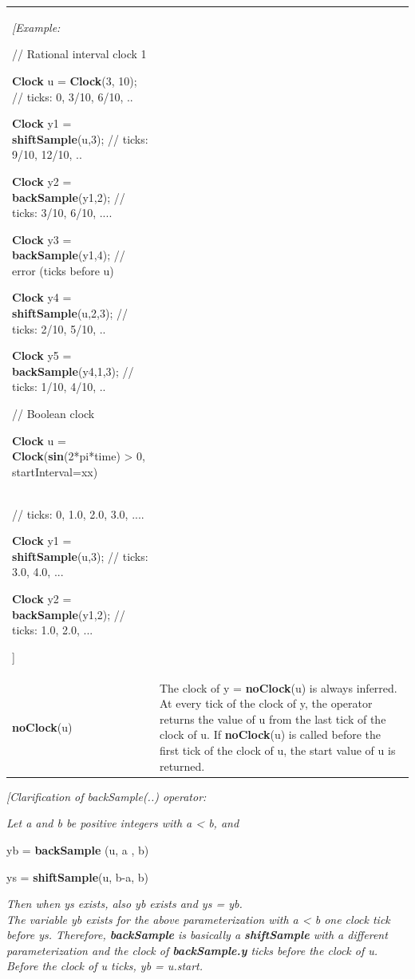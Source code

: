 \documentclass[10pt,a4paper]{report}
\begin{document}
\begin{longtable}[]{@{}ll@{}}
\emph{{[}Example:}

// Rational interval clock 1

\textbf{Clock} u = \textbf{Clock}(3, 10); // ticks: 0, 3/10, 6/10, ..

\textbf{Clock} y1 = \textbf{shiftSample}(u,3); // ticks: 9/10, 12/10, ..

\textbf{Clock} y2 = \textbf{backSample}(y1,2); // ticks: 3/10, 6/10,
....

\textbf{Clock} y3 = \textbf{backSample}(y1,4); // error (ticks before u)

\textbf{Clock} y4 = \textbf{shiftSample}(u,2,3); // ticks: 2/10, 5/10,
..

\textbf{Clock} y5 = \textbf{backSample}(y4,1,3); // ticks: 1/10, 4/10,
..

// Boolean clock

\textbf{Clock} u = \textbf{Clock}(\textbf{sin}(2*pi*time) \textgreater{}
0, startInterval=xx)\\
// ticks: 0, 1.0, 2.0, 3.0, ....

\textbf{Clock} y1 = \textbf{shiftSample}(u,3); // ticks: 3.0, 4.0, ...

\textbf{Clock} y2 = \textbf{backSample}(y1,2); // ticks: 1.0, 2.0, ...

{]}
\\ \hline
\textbf{noClock}(u)\strut
&
The clock of y = \textbf{noClock}(u) is always inferred. At every tick
of the clock of y, the operator returns the value of u from the last
tick of the clock of u. If \textbf{noClock}(u) is called before the
first tick of the clock of u, the start value of u is returned.\\ \hline
\end{longtable}

\emph{{[}Clarification of backSample(..) operator:}

\emph{Let a and b be positive integers with a \textless{} b, and}

yb = \textbf{backSample} (u, a , b)

ys = \textbf{shiftSample}(u, b-a, b)

\emph{Then when ys exists, also yb exists and ys = yb.\\
The variable yb exists for the above parameterization with a \textless{}
b one clock tick before ys. Therefore, \textbf{backSample} is basically
a \textbf{shiftSample} with a different parameterization and the clock
of \textbf{backSample.y} ticks before the clock of u. Before the clock
of u ticks, yb = u.start.}
\end{document}

